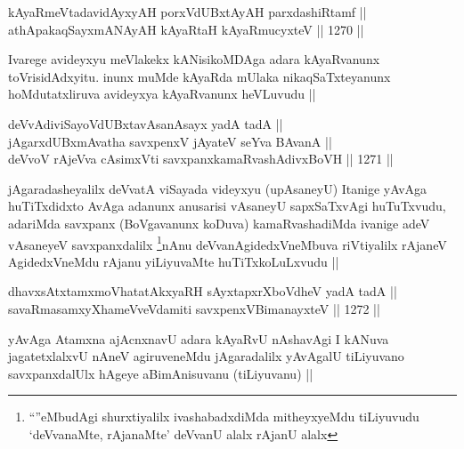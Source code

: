 
\begin{shl}
kAyaRmeVtadavidAyxyAH porxVdUBxtAyAH parxdashiRtamf || \\
athApakaqSayxmANAyAH kAyaRtaH kAyaRmucyxteV ||  1270 ||  
\end{shl}

\begin{artha}
Ivarege avideyxyu meVlakekx kANisikoMDAga adara kAyaRvanunx toVrisidAdxyitu. inunx muMde kAyaRda mUlaka nikaqSaTxteyanunx hoMdutatxliruva avideyxya kAyaRvanunx heVLuvudu ||
\end{artha}


\begin{shl}
deVvAdiviSayoVdUBxtavAsanA\s sayx yadA tadA || \\
jAgarxdUBxmAvatha savxpenxV jAyateV seYva BAvanA || \\
deVvoV rAjeVva cAsimxVti savxpanxkamaRvashAdivxBoVH ||  1271 ||  
\end{shl}

\begin{artha}
jAgaradasheyalilx deVvatA viSayada videyxyu (upAsaneyU) Itanige yAvAga huTiTxdidxto AvAga adanunx anusarisi vAsaneyU sapxSaTxvAgi huTuTxvudu, adariMda savxpanx (BoVgavanunx koDuva) kamaRvashadiMda ivanige adeV vAsaneyeV savxpanxdalilx \footnote{``\stext''eMbudAgi shurxtiyalilx ivashabadxdiMda mitheyxyeMdu tiLiyuvudu `deVvanaMte, rAjanaMte' deVvanU alalx rAjanU alalx}nAnu deVvanAgidedxVneMbuva riVtiyalilx rAjaneV AgidedxVneMdu rAjanu yiLiyuvaMte huTiTxkoLuLxvudu ||
\end{artha}


\begin{shl}
dhavxsAtxtamxmoVhatatAkxyaRH sAyxtapxrXboVdheV yadA tadA || \\
savaRmasamxyXhameVveVdamiti savxpenxV\s BimanayxteV ||  1272 || 
\end{shl}

\begin{artha}
yAvAga Atamxna ajAcnxnavU adara kAyaRvU nAshavAgi I kANuva jagatetxlalxvU nAneV agiruveneMdu jAgaradalilx yAvAgalU tiLiyuvano savxpanxdalUlx hAgeye aBimAnisuvanu (tiLiyuvanu) ||
\end{artha}


